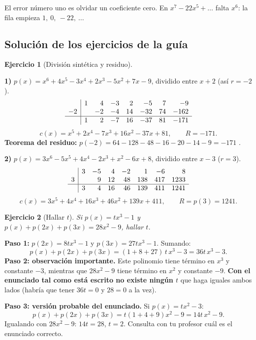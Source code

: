 \documentclass[11pt,a4paper]{article}
\theoremstyle{ej}
\newtheorem{ejercicio}{Ejercicio}[section]
\begin{document}
\begin{cuidado}
El error número uno es olvidar un coeficiente cero. En $x^7-22x^5+\dots$ falta $x^6$:
la fila empieza $1,\ 0,\ -22,\ \dots$
\end{cuidado}

\subsection{Solución de los ejercicios de la guía}

\begin{ejercicio}[División sintética y residuo]
\end{ejercicio}

\textbf{1)} $p(x)=x^6+4x^5-3x^4+2x^3-5x^2+7x-9$, dividido entre $x+2$ (así $r=-2$).
\[
\begin{array}{r|rrrrrrr}
 & 1 & 4 & -3 & 2 & -5 & 7 & -9\\
-2 & & -2 & -4 & 14 & -32 & 74 & -162\\ \hline
 & 1 & 2 & -7 & 16 & -37 & 81 & -171
\end{array}
\]
\[ c(x)=x^5+2x^4-7x^3+16x^2-37x+81,\qquad R=-171. \]
\textbf{Teorema del residuo:} $p(-2)=64-128-48-16-20-14-9=-171$ \checkmark.

\textbf{2)} $p(x)=3x^6-5x^5+4x^4-2x^3+x^2-6x+8$, dividido entre $x-3$ ($r=3$).
\[
\begin{array}{r|rrrrrrr}
 & 3 & -5 & 4 & -2 & 1 & -6 & 8\\
3 & & 9 & 12 & 48 & 138 & 417 & 1233\\ \hline
 & 3 & 4 & 16 & 46 & 139 & 411 & 1241
\end{array}
\]
\[ c(x)=3x^5+4x^4+16x^3+46x^2+139x+411,\qquad R=p(3)=1241. \]

\begin{ejercicio}[Hallar $t$]
Si $p(x)=tx^3-1$ y $p(x)+p(2x)+p(3x)=28x^2-9$, hallar $t$.
\end{ejercicio}

\textbf{Paso 1:} $p(2x)=8tx^3-1$ y $p(3x)=27tx^3-1$. Sumando:
\[ p(x)+p(2x)+p(3x)=(1+8+27)\,t\,x^3-3=36t\,x^3-3. \]
\textbf{Paso 2: observación importante.} Este polinomio tiene término en $x^3$ y constante $-3$,
mientras que $28x^2-9$ tiene término en $x^2$ y constante $-9$. \textbf{Con el enunciado tal como está escrito
no existe ningún $t$} que haga iguales ambos lados (habría que tener $36t=0$ y $28=0$ a la vez).

\textbf{Paso 3: versión probable del enunciado.} Si $p(x)=tx^2-3$:
\[ p(x)+p(2x)+p(3x)=t(1+4+9)x^2-9=14t\,x^2-9. \]
Igualando con $28x^2-9$: $14t=28$, \textbf{$t=2$}. Consulta con tu profesor cuál es el enunciado correcto.
\end{document}
